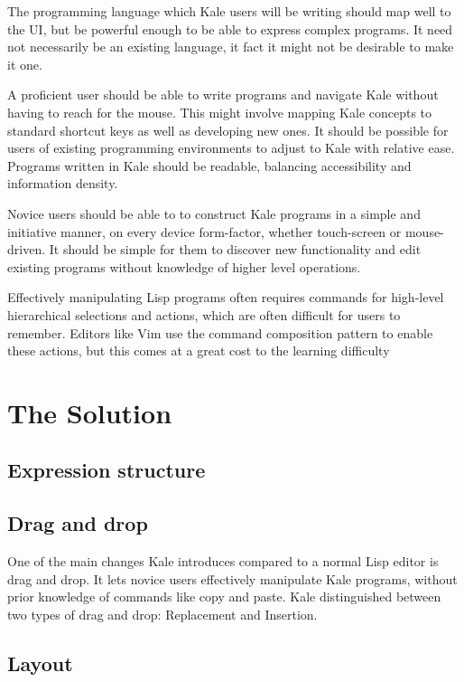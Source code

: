 \documentclass[11pt]{report}
\begin{document}
The programming language which Kale users will be writing should map well to
the UI, but be powerful enough to be able to express complex programs. It need
not necessarily be an existing language, it fact it might not be desirable to
make it one.

A proficient user should be able to write programs and navigate Kale without
having to reach for the mouse. This might involve mapping Kale concepts to
standard shortcut keys as well as developing new ones. It should be possible
for users of existing programming environments to adjust to Kale with relative
ease. Programs written in Kale should be readable, balancing accessibility and
information density.

Novice users should be able to to construct Kale programs in a simple and
initiative manner, on every device form-factor, whether touch-screen or
mouse-driven. It should be simple for them to discover new functionality and
edit existing programs without knowledge of higher level operations.

Effectively manipulating Lisp programs often requires commands for high-level
hierarchical selections and actions, which are often difficult for users to
remember. Editors like Vim use the command composition
pattern to enable these actions, but this comes at a great cost to the learning
difficulty \cite{Chodarev2016}

\chapter{The Solution}

\section{Expression structure}

\section{Drag and drop}

One of the main changes Kale introduces compared to a normal Lisp editor is
drag and drop. It lets novice users effectively manipulate Kale programs,
without prior knowledge of commands like copy and paste. Kale distinguished
between two types of drag and drop: Replacement and Insertion. 

\section{Layout}
\end{document}
